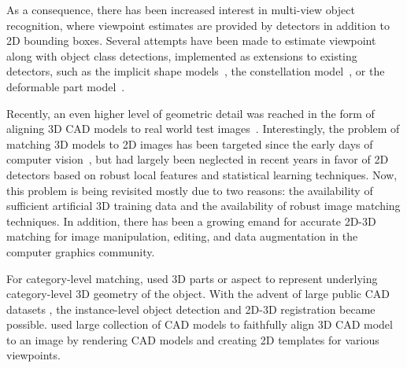 As a consequence, there has been increased interest in multi-view object
recognition, where viewpoint estimates are provided by
detectors in addition to 2D bounding boxes. Several attempts have been
made to estimate viewpoint along with object class detections,
implemented as extensions to existing detectors, such as the implicit
shape models~\cite{}, the constellation model~\cite{}, or the
deformable part model~\cite{Xiang12,Pepik12,Fidler12,Hejrati14}.

Recently, an even higher level of geometric detail was reached in the
form of aligning
3D CAD models to real world test images~\cite{Aubry14,
  Lim14}. Interestingly, the problem of matching 3D models to 2D
images has been targeted since the early days of computer
vision~\cite{Lowe87}, but had largely been neglected in recent years
in favor of 2D detectors based on robust local features and
statistical learning techniques. Now, this problem is being revisited
mostly due to two reasons: the availability of sufficient artificial
3D training data and the availability of robust image matching
techniques.
%
%
In addition, there has been a growing emand for accurate 2D-3D
matching \cite{Kholgade14, Chen13, Kostas14} for image manipulation,
editing, and data augmentation in the computer graphics community.

For category-level matching, \cite{Xiang12, Hejrati14, Pepik12} used
3D parts or aspect to represent underlying category-level 3D geometry
of the object. With the advent of large public CAD datasets
\cite{Trimble, Yobi}, the instance-level object detection and 2D-3D
registration became possible. \cite{Aubry14, Lim14} used large
collection of CAD models to faithfully align 3D CAD model to an image
by rendering CAD models and creating 2D templates for various
viewpoints.



